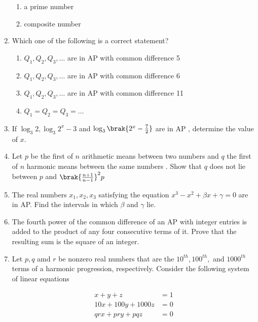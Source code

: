 \begin{enumerate}[label=\thesubsection.\arabic*,ref=\thesubsection.\theenumi]
\begin{multicols}{2}
\begin{enumerate}
	\item a prime number 
        \item composite number
%
	  \end{enumerate}
   \end{multicols}
    \item Which one of the following is a correct statement? 
%          
	    \hfill {}                                  
\begin{enumerate}    
	\item $Q_{1}, Q_{2}, Q_{3}, \dots$ are in AP with common difference 5 
	\item $Q_{1}, Q_{2}, Q_{3}, \dots$ are in AP with common difference 6
	\item $Q_{1}, Q_{2}, Q_{3}, \dots$ are in AP with common difference 11
	\item $Q_{1}=Q_{2}=Q_{3}=\dots$
	\end{enumerate}
%       
%
%	    
	     \item If $ \log_{3}{2}, \log_{3}{2^{x}-3} $ and $ \log_{3}{\brak{2^{x}-\frac{7}{2}}} $ are in  AP , determine the value of $x$.  
%     
	      \hfill {}
%      
%
      \item Let $p$ be the first of $n$ arithmetic means between two numbers and $q$ the first of $n$ harmonic means between the same numbers . Show that $q$ does not lie between $p$ and $\brak{\frac{n+1}{n-1}}^{2}p$ 
%       
	      \hfill {}
%      
%
%       
%
		\item  The real numbers $ x_{1}, x_{2}, x_{3} $ satisfying the equation $ x^{3}-x^{2}+\beta x+\gamma=0 $ are in AP. Find the intervals in which $ \beta $ and $\gamma$ lie.
%       
			\hfill {}
%      
%
%
      \item The fourth power of the common difference of an  AP  with integer entries is added to the product of any four consecutive terms of it. Prove that the resulting sum is the square of an integer.
%      
	      \hfill {}
\item     Let $p,q$ amd $r$  be nonzero real numbers that are the $10^{th}, 100^{th},$ and $1000^{th}$ terms of a harmonic progression, respectively. Consider the following system of linear equations

	\hfill {}
\begin{align*}
x + y + z &= 1
\\
10x + 100y + 1000z &= 0
\\
qr x + pr y + pq z &= 0
\end{align*}


\end{enumerate}
